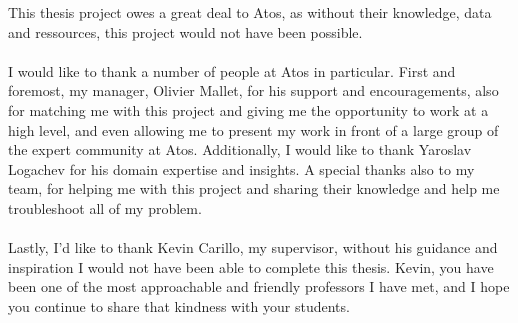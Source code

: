 \begin{acknowledgments}
This thesis project owes a great deal to Atos, as without their knowledge, data and ressources, this project would not have been possible. \\
\\
I would like to thank a number of people at Atos in particular. First and foremost, my manager, Olivier Mallet, for his support and encouragements, also for matching me with this project and giving me the opportunity to work at a high level, and even allowing me to present my work in front of a large group of the expert community at Atos. Additionally, I would like to thank Yaroslav Logachev for his domain expertise and insights. A special thanks also to my team, for helping me with this project and sharing their knowledge and help me troubleshoot all of my problem.\\
\\
Lastly, I’d like to thank Kevin Carillo, my supervisor, without his guidance and inspiration I would not have been able to complete this thesis. Kevin, you have been one of the most approachable and friendly professors I have met, and I hope you continue to share that kindness with your students.
\end{acknowledgments}